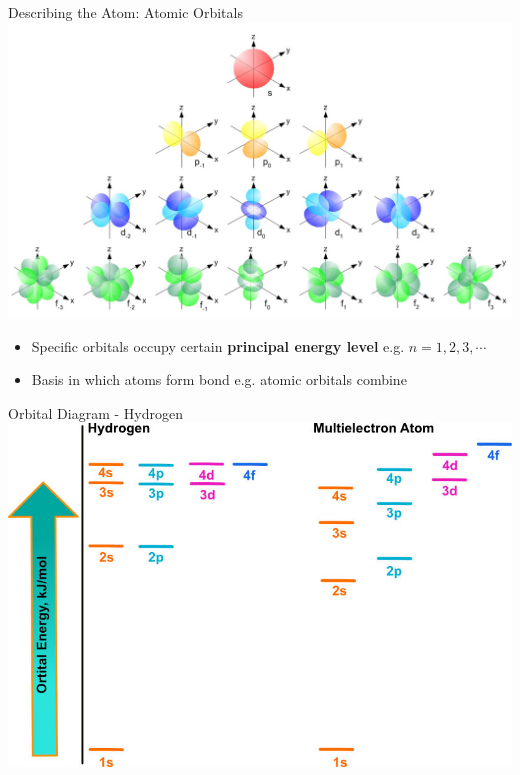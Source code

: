 \documentclass[11pt]{beamer}
\begin{document}
\begin{frame}{Describing the Atom: Atomic Orbitals}
  \centering
  \includegraphics[width=0.8\linewidth]{single_elect_orb}
  \begin{itemize}
  \item Specific orbitals occupy certain \textbf{principal energy level} e.g.
    $n = 1, 2, 3, \cdots$
  \item Basis in which atoms form bond e.g. atomic orbitals combine
  \end{itemize}
\end{frame}

\begin{frame}{Orbital Diagram - Hydrogen}
  \centering
  \includegraphics[scale=1.5,trim={0 0 1.2in 0},clip]{orbital_energy}
\end{frame}
\end{document}
